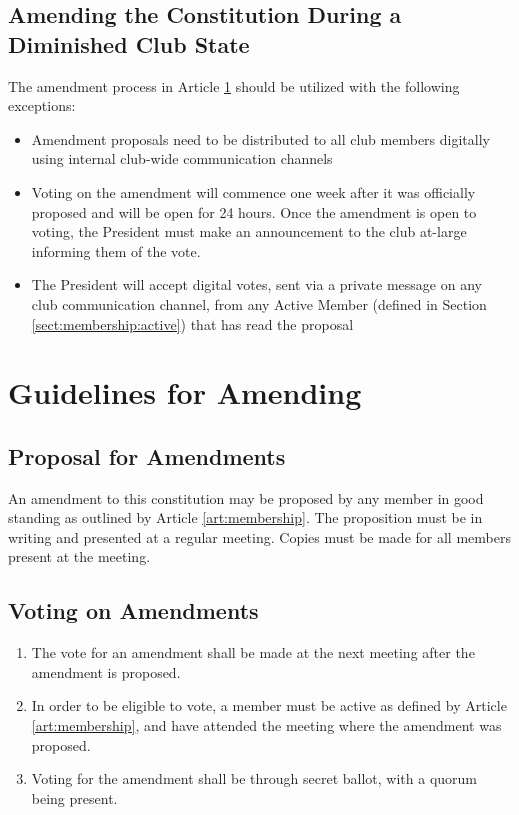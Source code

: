\documentclass[english,11pt]{article}
\begin{document}
\subsection{Amending the Constitution During a Diminished Club State} \label{subsect:reduced:amending}
The amendment process in Article \ref{art:amending} should be utilized with the following exceptions:

\begin{itemize}
    \item Amendment proposals need to be distributed to all club members digitally using internal club-wide communication channels
    \item Voting on the amendment will commence one week after it was officially proposed and will be open for 24 hours.
        Once the amendment is open to voting, the President must make an announcement to the club at-large informing them of the vote.
    \item The President will accept digital votes, sent via a private message on any club communication channel, from any Active Member (defined in Section \ref{sect:membership:active}) that has read the proposal
\end{itemize}

\section{Guidelines for Amending} \label{art:amending}

\subsection{Proposal for Amendments} \label{sect:amending:proposal}
An amendment to this constitution may be proposed by any member in good standing as outlined by Article \ref{art:membership}.
The proposition must be in writing and presented at a regular meeting.
Copies must be made for all members present at the meeting.

\subsection{Voting on Amendments}  \label{sect:amending:voting}
\begin{enumerate}[label=\Alph*.]
    \item The vote for an amendment shall be made at the next meeting after the amendment is proposed.
    \item In order to be eligible to vote, a member must be active as defined by Article \ref{art:membership}, and have attended the meeting where the amendment was proposed.
    \item Voting for the amendment shall be through secret ballot, with a quorum being present.
\end{enumerate}
\end{document}
